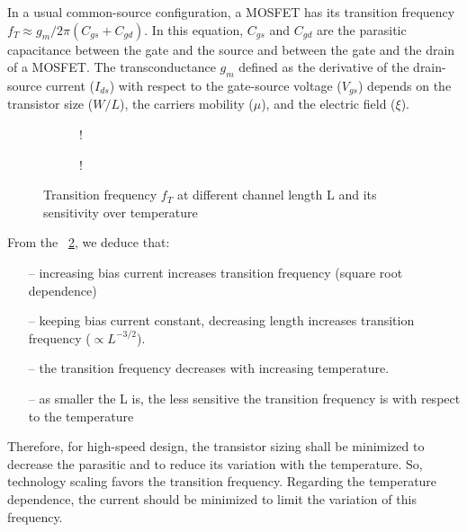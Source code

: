 In a usual common-source configuration, a MOSFET has its transition frequency \(f_T \approx g_m/2\pi (C_{gs}+C_{gd})\). In this equation, \(C_{gs} \) and  \(C_{gd} \) are the parasitic capacitance between the gate and the source and between the gate and the drain of a MOSFET. The transconductance \(g_m \) defined as the derivative of the drain-source current (\(I_{ds} \)) with respect to the gate-source voltage (\(V_{gs}\)) depends on the transistor size (\(W/L\)), the carriers mobility (\(\mu \)), and the electric field (\(\xi \)).

\begin{figure}[!ht]
	\centering
	\begin{subfigure}[b]{0.48\textwidth}
		\resizebox {\textwidth} {!} { 
			
		}
	\end{subfigure}
	\begin{subfigure}[b]{0.48\textwidth}
		\resizebox {\textwidth} {!} { 
			
		}
		\label{fig:ft_nel_sensitivity}
	\end{subfigure}
	\caption{Transition frequency \(f_T\) at different channel length L and its sensitivity over temperature}
	\label{fig:ft_nel}
\end{figure}

From the \figurename~\ref{fig:ft_nel}, we deduce that:
\begin{itemize}
	\item[--] increasing bias current increases transition frequency (square root dependence)
	\item[--] keeping bias current constant, decreasing length increases transition frequency (\(\propto L^{-3/2}\)).
	\item[--] the transition frequency decreases with increasing temperature.
	\item[--] as smaller the L is, the less sensitive the transition frequency is with respect to the temperature
\end{itemize}
Therefore, for high-speed design, the transistor sizing shall be minimized to decrease the parasitic and to reduce its variation with the temperature. So, technology scaling favors the transition frequency. Regarding the temperature dependence, the current should be minimized to limit the variation of this frequency.

